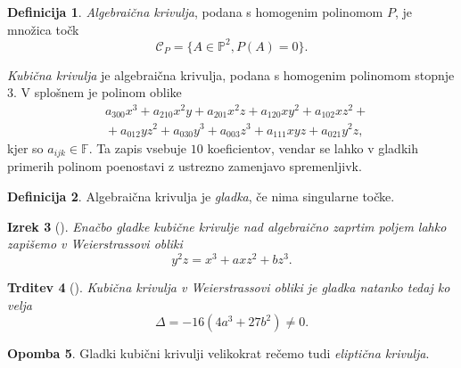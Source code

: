 \documentclass[12pt,a4paper,twoside]{article}
\theoremstyle{definition} %
\newtheorem{definicija}{Definicija}[section]
\newtheorem{opomba}[definicija]{Opomba}
\theoremstyle{plain} %
\newtheorem{izrek}[definicija]{Izrek}
\newtheorem{trditev}[definicija]{Trditev}
\numberwithin{equation}{section}  %
\newcommand{\F}{\mathbb F}
\begin{document}
\begin{definicija}
\emph{Algebraična krivulja}, podana s homogenim polinomom $P$, je množica točk 
$$\mathcal{C}_P= \{ A \in \mathbb{P}^2, P(A) = 0 \}.$$
\end{definicija}

\emph{Kubična krivulja} je algebraična krivulja, podana s homogenim polinomom stopnje 3. V splošnem je polinom oblike
\begin{align}
&{} a_{300}x^3+a_{210}x^2y+a_{201}x^2z+a_{120}xy^2+a_{102}xz^2+ \nonumber \\
&{}+a_{012}yz^2+a_{030}y^3+a_{003}z^3+a_{111}xyz+a_{021}y^2z, \nonumber
\end{align}
kjer so $a_{ijk} \in \F$.
Ta zapis vsebuje $10$ koeficientov, vendar se lahko v gladkih primerih polinom poenostavi z ustrezno zamenjavo spremenljivk.
\begin{definicija}
Algebraična krivulja je \emph{gladka}, če nima singularne točke.
\end{definicija}

\begin{izrek}[]
Enačbo gladke kubične krivulje nad algebraično zaprtim poljem lahko zapišemo v Weierstrassovi obliki
$$y^2z = x^3 + axz^2 + bz^3.$$
\end{izrek}

\begin{trditev}[]
Kubična krivulja v Weierstrassovi obliki je gladka natanko tedaj ko velja
$$\Delta = -16(4a^3+27b^2) \neq 0.$$
\end{trditev}

\begin{opomba}
Gladki kubični krivulji  velikokrat rečemo tudi \emph{eliptična krivulja}.
\end{opomba}
\end{document}
